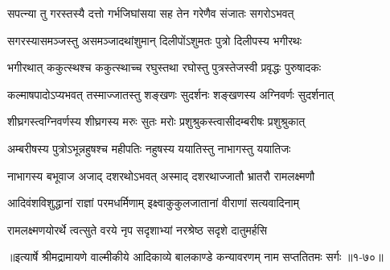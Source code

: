 \twolineshloka
{सपत्न्या तु गरस्तस्यै दत्तो गर्भजिघांसया}
{सह तेन गरेणैव संजातः सगरोऽभवत्} %

\twolineshloka
{सगरस्यासमञ्जस्तु असमञ्जादथांशुमान्}
{दिलीपोंऽशुमतः पुत्रो दिलीपस्य भगीरथः} %

\twolineshloka
{भगीरथात् ककुत्स्थश्च ककुत्स्थाच्च रघुस्तथा}
{रघोस्तु पुत्रस्तेजस्वी प्रवृद्धः पुरुषादकः} %

\twolineshloka
{कल्माषपादोऽप्यभवत् तस्माज्जातस्तु शङ्खणः}
{सुदर्शनः शङ्खणस्य अग्निवर्णः सुदर्शनात्} %

\twolineshloka
{शीघ्रगस्त्वग्निवर्णस्य शीघ्रगस्य मरुः सुतः}
{मरोः प्रशुश्रुकस्त्वासीदम्बरीषः प्रशुश्रुकात्} %

\twolineshloka
{अम्बरीषस्य पुत्रोऽभून्नहुषश्च महीपतिः}
{नहुषस्य ययातिस्तु नाभागस्तु ययातिजः} %

\twolineshloka
{नाभागस्य बभूवाज अजाद् दशरथोऽभवत्}
{अस्माद् दशरथाज्जातौ भ्रातरौ रामलक्ष्मणौ} %

\twolineshloka
{आदिवंशविशुद्धानां राज्ञां परमधर्मिणाम्}
{इक्ष्वाकुकुलजातानां वीराणां सत्यवादिनाम्} %

\twolineshloka
{रामलक्ष्मणयोरर्थे त्वत्सुते वरये नृप}
{सदृशाभ्यां नरश्रेष्ठ सदृशे दातुमर्हसि} %


॥इत्यार्षे श्रीमद्रामायणे वाल्मीकीये आदिकाव्ये बालकाण्डे कन्यावरणम् नाम सप्ततितमः सर्गः ॥१-७०॥
